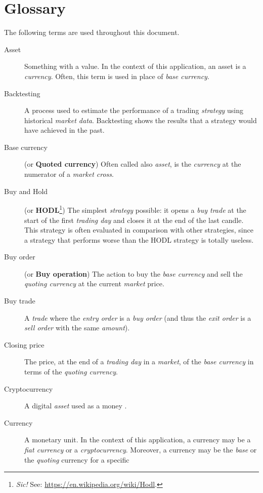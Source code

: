 \chapter{Glossary}\label{appendix:glossary}

The following terms are used throughout this document.

\begin{description}
	\item[Asset] Something with a value. In the context of this application,
		an asset is a \textit{currency}. Often, this term is used in
		place of \textit{base currency}.
	\item[Backtesting] A process used to estimate the performance of a
		trading \textit{strategy} using historical \textit{market data}.
		Backtesting shows the results that a strategy would have
		achieved in the past.
	\item[Base currency] (or \textbf{Quoted currency}) Often called also
		\textit{asset}, is the \textit{currency} at the numerator of a
		\textit{market cross}.
	\item[Buy and Hold] (or \textbf{HODL}\footnote{\textit{Sic!} See:
		\url{https://en.wikipedia.org/wiki/Hodl}.}) The simplest
		\textit{strategy} possible: it opens a \textit{buy trade} at the
		start of the first \textit{trading day} and closes it at the end
		of the last candle. This strategy is often evaluated in
		comparison with other strategies, since a strategy that performs
		worse than the HODL strategy is totally useless.
	\item[Buy order] (or \textbf{Buy operation}) The action to buy the
		\textit{base currency} and sell the \textit{quoting currency} at
		the current \textit{market} price.
	\item[Buy trade] A \textit{trade} where the \textit{entry order} is a
		\textit{buy order} (and thus the \textit{exit order} is a
		\textit{sell order} with the same \textit{amount}).
	\item[Closing price] The price, at the end of a \textit{trading
		day} in a \textit{market}, of the \textit{base currency} in
		terms of the \textit{quoting currency}.
	\item[Cryptocurrency] A digital \textit{asset} used as a money
		.
	\item[Currency] A monetary unit. In the context of this application, a
		currency may be a \textit{fiat currency} or a
		\textit{cryptocurrency}. Moreover, a currency may be the
		\textit{base} or the \textit{quoting} currency for a specific

\end{description}
